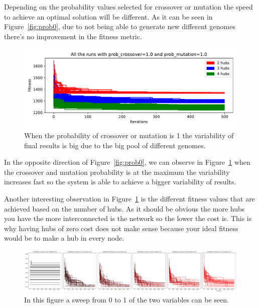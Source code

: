 \documentclass[12pt,oneside,a4paper]{article}
\begin{document}
    \newline
    Depending on the probability values selected for crossover or mutation the speed to achieve an optimal solution
    will be different.
    As it can be seen in Figure~\ref{fig:prob0}, due to not being able to generate new different genomes
    there's no improvement in the fitness metric.

    \begin{figure}[h]
        \includegraphics[width=\textwidth]{max_cross_mut}
        \caption{When the probability of crossover or mutation is 1 the variability of final results is big due to
        the big pool of different genomes.}
        \label{fig:prob1}
    \end{figure}

    In the opposite direction of Figure~\ref{fig:prob0}, we can observe in Figure~\ref{fig:prob1} when the crossover
    and mutation probability is at the maximum the variability increases fast so the system is able to achieve a
    bigger variability of results.

    \newline
    Another interesting observation in Figure~\ref{fig:prob1} is the different fitness values that are achieved based on
    the number of hubs.
    As it should be obvious the more hubs you have the more interconnected is the network so the lower the cost is.
    This is why having hubs of zero cost does not make sense because your ideal fitness would be to make a hub in
    every node.

    \begin{figure}[h]
        \includegraphics[width=\textwidth]{sweep_values_get_best_fitness}
        \caption{In this figure a sweep from 0 to 1 of the two variables can be seen.}
        \label{fig:sweep_best}
    \end{figure}
\end{document}
